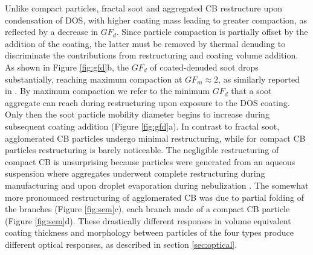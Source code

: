 Unlike compact particles, fractal soot and aggregated CB restructure upon condensation of DOS, with higher coating mass leading to greater compaction, as reflected by a decrease in $GF_d$. Since particle compaction is partially offset by the addition of the coating, the latter must be removed by thermal denuding to discriminate the contributions from restructuring and coating volume addition. As shown in Figure \ref{fig:gfd}b, the $GF_d$ of coated-denuded soot drops substantially, reaching maximum compaction at $GF_m \approx 2$, as similarly reported in \citep{RN13}. By maximum compaction we refer to the minimum $GF_d$ that a soot aggregate can reach during restructuring upon exposure to the DOS coating. Only then the soot particle mobility diameter begins to increase during subsequent coating addition (Figure \ref{fig:gfd}a). In contrast to fractal soot, agglomerated CB particles undergo minimal restructuring, while for compact CB particles restructuring is barely noticeable. The negligible restructuring of compact CB is unsurprising because particles were generated from an aqueous suspension where aggregates underwent complete restructuring during manufacturing and upon droplet evaporation during nebulization \citep{RN51}. The somewhat more pronounced restructuring of agglomerated CB was due to partial folding of the branches (Figure \ref{fig:sem}c), each branch made of a compact CB particle (Figure \ref{fig:sem}d). These drastically different responses in volume equivalent coating thickness and morphology between particles of the four types produce different optical responses, as described in section \ref{sec:optical}.
